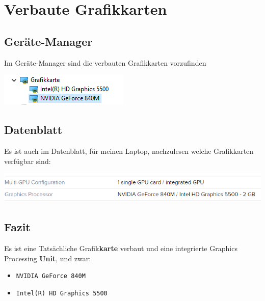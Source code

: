 
\section{Verbaute Grafikkarten}


\subsection{Geräte-Manager}
Im Geräte-Manager sind die verbauten Grafikkarten vorzufinden

\begin{minipage}{\linewidth}
	\centering
	\includegraphics[width=0.8\linewidth]{images/graka}
\end{minipage}

\subsection{Datenblatt}
Es ist auch im Datenblatt, für meinen Laptop, nachzulesen welche Grafikkarten verfügbar sind:


\begin{minipage}{\linewidth}
	\centering
	\includegraphics[width=0.8\linewidth]{images/graka2}
\end{minipage}

\subsection{Fazit}
Es ist eine Tatsächliche Grafik\textbf{karte} verbaut und eine integrierte Graphics Processing \textbf{Unit}, und zwar:

\begin{itemize}
	\item \verb|NVIDIA GeForce 840M|
	\item \verb|Intel(R) HD Graphics 5500|
\end{itemize}

